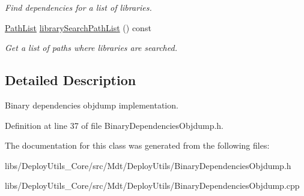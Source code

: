 \begin{DoxyCompactItemize}
\begin{DoxyCompactList}\small\item\em Find dependencies for a list of libraries. \end{DoxyCompactList}\item 
\hyperlink{class_mdt_1_1_deploy_utils_1_1_path_list}{Path\+List} \hyperlink{class_mdt_1_1_deploy_utils_1_1_binary_dependencies_objdump_af0ed8d25c32ae6fa1540ce43c63b1af6}{library\+Search\+Path\+List} () const \hypertarget{class_mdt_1_1_deploy_utils_1_1_binary_dependencies_objdump_af0ed8d25c32ae6fa1540ce43c63b1af6}{}\label{class_mdt_1_1_deploy_utils_1_1_binary_dependencies_objdump_af0ed8d25c32ae6fa1540ce43c63b1af6}

\begin{DoxyCompactList}\small\item\em Get a list of paths where libraries are searched. \end{DoxyCompactList}\end{DoxyCompactItemize}


\subsection{Detailed Description}
Binary dependencies objdump implementation. 

Definition at line 37 of file Binary\+Dependencies\+Objdump.\+h.



The documentation for this class was generated from the following files\+:\begin{DoxyCompactItemize}
\item 
libs/\+Deploy\+Utils\+\_\+\+Core/src/\+Mdt/\+Deploy\+Utils/Binary\+Dependencies\+Objdump.\+h\item 
libs/\+Deploy\+Utils\+\_\+\+Core/src/\+Mdt/\+Deploy\+Utils/Binary\+Dependencies\+Objdump.\+cpp\end{DoxyCompactItemize}
